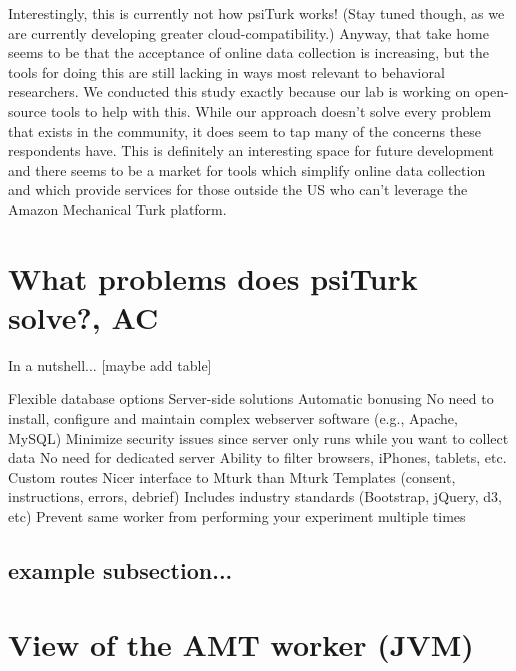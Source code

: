 \documentclass[jou,apacite]{apa6}
\begin{document}
Interestingly, this is currently not how psiTurk works! (Stay tuned though, as we are currently developing greater cloud-compatibility.)
Anyway, that take home seems to be that the acceptance of online data collection is increasing, but the tools for doing this are still lacking in ways most relevant to behavioral researchers.
We conducted this study exactly because our lab is working on open-source tools to help with this.
While our approach doesn't solve every problem that exists in the community, it does seem to tap many of the concerns these respondents have.
This is definitely an interesting space for future development and there seems to be a market for tools which simplify online data collection and which provide services for those outside the US who can't leverage the Amazon Mechanical Turk platform.



\section{What problems does psiTurk solve?, AC}
In a nutshell... [maybe add table]

Flexible database options
Server-side solutions
Automatic bonusing
No need to install, configure and maintain complex webserver software (e.g., Apache, MySQL)
Minimize security issues since server only runs while you want to collect data
No need for dedicated server
Ability to filter browsers, iPhones, tablets, etc. 
Custom routes
Nicer interface to Mturk than Mturk 
Templates (consent, instructions, errors, debrief)
Includes industry standards (Bootstrap, jQuery, d3, etc) 
Prevent same worker from performing your experiment multiple times



\subsection{example subsection...}

\section{View of the AMT worker (JVM)}

\end{document}
